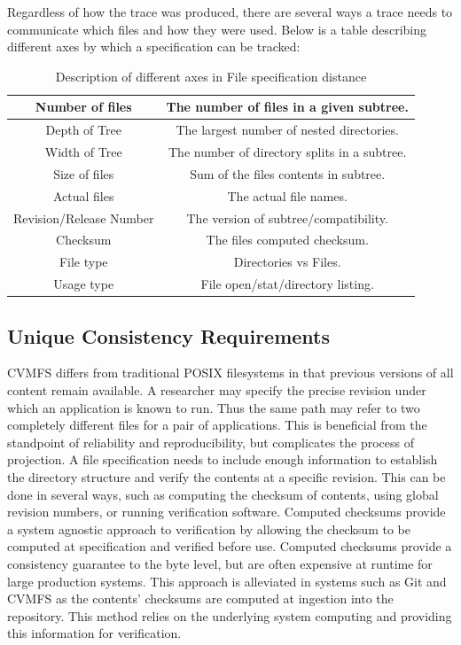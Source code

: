 \documentclass[sigconf]{acmart}
\begin{document}
Regardless of how the trace was produced,
there are several ways a trace needs to communicate 
which files and how they were used.
Below is a table describing different axes by which a 
specification can be tracked:
\begin{table}[h]
    \centering
    \begin{tabular}{|c|c|}
    \hline
    Number of files & The number of files in a given subtree. \\ \hline
    Depth of Tree & The largest number of nested directories. \\ \hline
    Width of Tree & The number of directory splits in a subtree.\\ \hline
    Size of files & Sum of the files contents in subtree.\\ \hline
    Actual files & The actual file names.\\ \hline
    Revision/Release Number & The version of subtree/compatibility. \\ \hline
    Checksum & The files computed checksum. \\ \hline
    File type & Directories vs Files.\\ \hline
    Usage type & File open/stat/directory listing.\\ \hline
    \end{tabular}
    \caption{Description of different axes in File specification distance}
    \label{tab:distance_axes}
\end{table}


\subsection{Unique Consistency Requirements}
CVMFS differs from traditional POSIX filesystems in that previous versions of all content remain available.
A researcher may specify the precise revision under which an application is known to run.
Thus the same path may refer to two completely different files for a pair of applications.
This is beneficial from the standpoint of reliability and reproducibility,
but complicates the process of projection.
A file specification needs to include enough information
to establish the directory structure and verify the contents at a specific revision.
This can be done in several ways, 
such as computing the checksum of contents,
using global revision numbers, 
or running verification software.
Computed checksums provide a system agnostic approach
to verification by allowing the checksum to be computed
at specification and verified before use.
Computed checksums provide a
consistency guarantee to the byte level,
but are often expensive at runtime for large
production systems.
This approach is alleviated in systems such as 
Git and CVMFS as the contents' checksums are 
computed at ingestion into the repository.
This method relies on the underlying system computing
and providing this information for verification.
\end{document}
